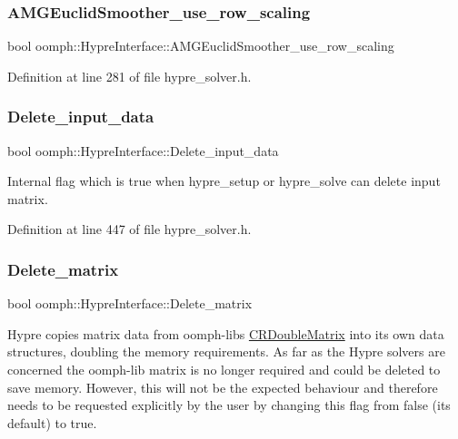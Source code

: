 \subsubsection{\texorpdfstring{A\+M\+G\+Euclid\+Smoother\+\_\+use\+\_\+row\+\_\+scaling}{AMGEuclidSmoother\_use\_row\_scaling}}
{\footnotesize\ttfamily bool oomph\+::\+Hypre\+Interface\+::\+A\+M\+G\+Euclid\+Smoother\+\_\+use\+\_\+row\+\_\+scaling}



Definition at line 281 of file hypre\+\_\+solver.\+h.

\mbox{\label{classoomph_1_1HypreInterface_a0117cae635c9242ccfd9ad7153511c07}} 
\subsubsection{\texorpdfstring{Delete\+\_\+input\+\_\+data}{Delete\_input\_data}}
{\footnotesize\ttfamily bool oomph\+::\+Hypre\+Interface\+::\+Delete\+\_\+input\+\_\+data\hspace{0.3cm}{\ttfamily [protected]}}



Internal flag which is true when hypre\+\_\+setup or hypre\+\_\+solve can delete input matrix. 



Definition at line 447 of file hypre\+\_\+solver.\+h.

\mbox{\label{classoomph_1_1HypreInterface_a8668ea7323b2efb227a461e80d62b044}} 
\subsubsection{\texorpdfstring{Delete\+\_\+matrix}{Delete\_matrix}}
{\footnotesize\ttfamily bool oomph\+::\+Hypre\+Interface\+::\+Delete\+\_\+matrix\hspace{0.3cm}{\ttfamily [private]}}



Hypre copies matrix data from oomph-\/lib\textquotesingle{}s \hyperlink{classoomph_1_1CRDoubleMatrix}{C\+R\+Double\+Matrix} into its own data structures, doubling the memory requirements. As far as the Hypre solvers are concerned the oomph-\/lib matrix is no longer required and could be deleted to save memory. However, this will not be the expected behaviour and therefore needs to be requested explicitly by the user by changing this flag from false (its default) to true. 



